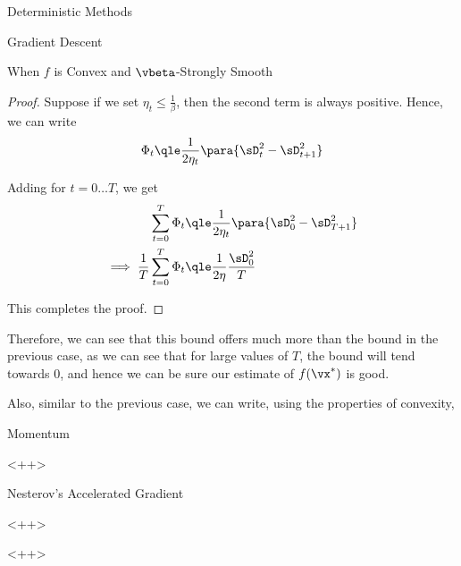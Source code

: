 \documentclass{article}
\newcommand{\fs}{f(\vx^\ast)}
\newcommand{\x}[1]{\vx^{(#1)}}
\begin{document}
\begin{psection}{Deterministic Methods}
\begin{psubsection}{Gradient Descent}
\begin{pssubsection}{When $f$ is Convex and $\vbeta$-Strongly Smooth}
\begin{theorem}
\begin{proof}
					Suppose if we set $\eta_t \le \frac{1}{\beta}$, then the second term is always positive. Hence, we can write
					\begin{align*}
						\Phi_t	\qle	\frac{1}{2 \eta_t} \para{\sD_t^2 - \sD_{t + 1}^2}
					\end{align*}

					Adding for $t = 0 \dots T$, we get
					\begin{align*}
						\sum_{t = 0}^T	\Phi_t						&\qle	\frac{1}{2 \eta_t} \para{\sD_0^2 - \sD_{T + 1}^2} \\
						\implies \frac{1}{T} \sum_{t = 0}^T	\Phi_t	&\qle	\frac{1}{2 \eta} \frac{\sD_0^2}{T}
					\end{align*}

					This completes the proof.
				\end{proof}
			\end{theorem}

			Therefore, we can see that this bound offers much more than the bound in the previous case, as we can see that for large values of $T$, the bound will tend towards 0, and hence we can be sure our estimate of $\fs$ is good.

			Also, similar to the previous case, we can write, using the properties of convexity,
			\answer{
				\begin{equation}
					\func{f}{\frac{1}{T} \sum_{t = 1}^T \x{t}}	\qle	\frac{1}{2 \eta} \cdot \frac{\sD_0^2}{T}
					\label{eq:gd-2-bound}
				\end{equation}
			}

		\end{pssubsection}

	\end{psubsection}

	\begin{psubsection}{Momentum}

		<++>

	\end{psubsection}

	\begin{psubsection}{Nesterov's Accelerated Gradient}

		

	\end{psubsection}<++>

\end{psection}<++>
\end{document}
